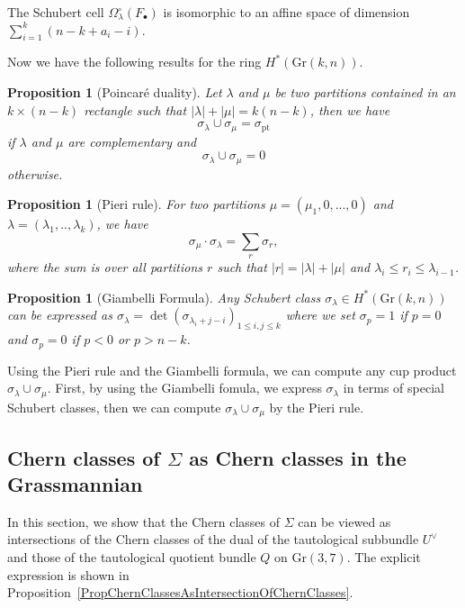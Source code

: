 \documentclass{article}
\newtheorem{proposition}[theorem]{Proposition}
\theoremstyle{definition}
\begin{document}
The Schubert cell \( \Omega_\lambda^\circ(F_\bullet) \) is isomorphic to an affine space of dimension \( \sum_{i=1}^k (n-k+a_i-i) \).

Now we have the following results for the ring $H^*(\text{Gr}(k, n))$.
\begin{proposition}[Poincar\'e duality] Let $\lambda$ and $\mu$ be two partitions contained in an $k\times (n-k)$ rectangle such that $|\lambda|+|\mu|=k(n-k)$, then we have $$\sigma_\lambda\cup\sigma_\mu=\sigma_{\mathrm{pt}}$$ if $\lambda$ and $\mu$ are complementary and 
$$\sigma_\lambda\cup\sigma_\mu=0$$ 
otherwise.
\end{proposition}
\begin{proposition}[Pieri rule] For two partitions $\mu=(\mu_1,0,...,0)$ and $\lambda=(\lambda_1,..,\lambda_k)$, we have
$$\sigma_\mu \cdot \sigma_\lambda = \sum_r \sigma_r,
$$
where the sum is over all partitions $r$ such that $|r|=|\lambda|+|\mu|$ and $\lambda_i\leq r_i\leq\lambda_{i-1}$.
\end{proposition}
\begin{proposition}[Giambelli Formula] Any Schubert class $\sigma_\lambda\in H^*(\text{Gr}(k, n))$ can be expressed as $\sigma_\lambda=\det(\sigma_{\lambda_i+j-i})_{1\leq i, j\leq k}$ where we set $\sigma_p=1$ if $p=0$ and $\sigma_p=0$ if $p<0$ or $p>n-k$.
\end{proposition}
Using the Pieri rule and the Giambelli formula, we can compute any cup product $\sigma_\lambda\cup\sigma_\mu$. First, by using the Giambelli fomula, we express $\sigma_\lambda$ in terms of special Schubert classes, then we can compute $\sigma_\lambda\cup\sigma_\mu$ by the Pieri rule.





\subsection{Chern classes of $\Sigma$ as Chern classes in the Grassmannian}
In this section, we show that the Chern classes of $\Sigma$ can be viewed as intersections of the Chern classes of the dual of the tautological subbundle $U^\vee$ and those of the tautological quotient bundle $Q$ on $\mathrm{Gr}(3, 7)$. The explicit expression is shown in Proposition~\ref{PropChernClassesAsIntersectionOfChernClasses}.
\end{document}
